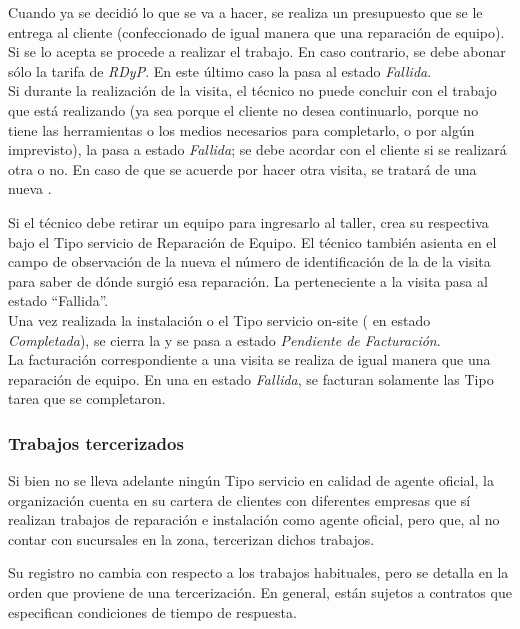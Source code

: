 \documentclass[12pt]{extarticle}
\begin{document}
\begin{spacing}{1.2}
    Cuando ya se decidió lo que se va a hacer, se realiza un presupuesto que se le entrega al cliente (confeccionado de igual manera que una reparación de equipo). Si se lo acepta se procede a realizar el trabajo. En caso contrario, se debe abonar sólo la tarifa de \textit{RDyP}. En este último caso la \OT{} pasa al estado \textit{Fallida}.\\

    Si durante la realización de la visita, el técnico no puede concluir con el trabajo que está realizando (ya sea porque el cliente no desea continuarlo, porque no tiene las herramientas o los medios necesarios para completarlo, o por algún imprevisto), la \OT{} pasa a estado \textit{Fallida}; se debe acordar con el cliente si se realizará otra o no. En caso de que se acuerde por hacer otra visita, se tratará de una nueva \OT{}.
    
    Si el técnico debe retirar un equipo para ingresarlo al taller, crea su respectiva \OT{} bajo el Tipo servicio de Reparación de Equipo. El técnico también asienta en el campo de observación de la nueva \OT{} el número de identificación de la \OT{} de la visita para saber de dónde surgió esa reparación. La \OT{} perteneciente a la visita pasa al estado ``Fallida''.\\

    Una vez realizada la instalación o el Tipo servicio on-site (\OT{} en estado \textit{Completada}), se cierra la \OT{} y se pasa a estado \textit{Pendiente de Facturación}.\\

    La facturación correspondiente a una visita se realiza de igual manera que una reparación de equipo. En una \OT{} en estado \textit{Fallida}, se facturan solamente las Tipo tarea que se completaron.

    \subsubsection{Trabajos tercerizados}
    Si bien no se lleva adelante ningún Tipo servicio en calidad de agente oficial, la organización cuenta en su cartera de clientes con diferentes empresas que sí realizan trabajos de reparación e instalación como agente oficial, pero que, al no contar con sucursales en la zona, tercerizan dichos trabajos.

    Su registro no cambia con respecto a los trabajos habituales, pero se detalla en la orden que proviene de una tercerización.
    En general, están sujetos a contratos que especifican condiciones de tiempo de respuesta.\\


\end{spacing}
\end{document}
